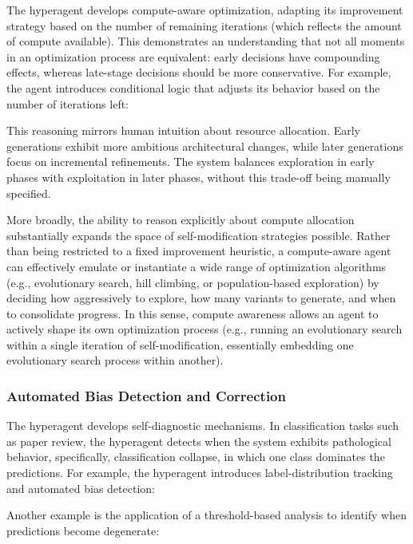 \documentclass[]{fairmeta}
\begin{document}
The hyperagent develops compute-aware optimization, adapting its improvement strategy based on the number of remaining iterations (which reflects the amount of compute available). This demonstrates an understanding that not all moments in an optimization process are equivalent: early decisions have compounding effects, whereas late-stage decisions should be more conservative. For example, the agent introduces conditional logic that adjusts its behavior based on the number of iterations left:


This reasoning mirrors human intuition about resource allocation. Early generations exhibit more ambitious architectural changes, while later generations focus on incremental refinements. The system balances exploration in early phases with exploitation in later phases, without this trade-off being manually specified.

More broadly, the ability to reason explicitly about compute allocation substantially expands the space of self-modification strategies possible. Rather than being restricted to a fixed improvement heuristic, a compute-aware agent can effectively emulate or instantiate a wide range of optimization algorithms (e.g., evolutionary search, hill climbing, or population-based exploration) by deciding how aggressively to explore, how many variants to generate, and when to consolidate progress. In this sense, compute awareness allows an agent to actively shape its own optimization process (e.g., running an evolutionary search within a single iteration of self-modification, essentially embedding one evolutionary search process within another).

\subsubsection{Automated Bias Detection and Correction}

The hyperagent develops self-diagnostic mechanisms. In classification tasks such as paper review, the hyperagent detects when the system exhibits pathological behavior, specifically, classification collapse, in which one class dominates the predictions. For example, the hyperagent introduces label-distribution tracking and automated bias detection:


Another example is the application of a threshold-based analysis to identify when predictions become degenerate:

\end{document}
